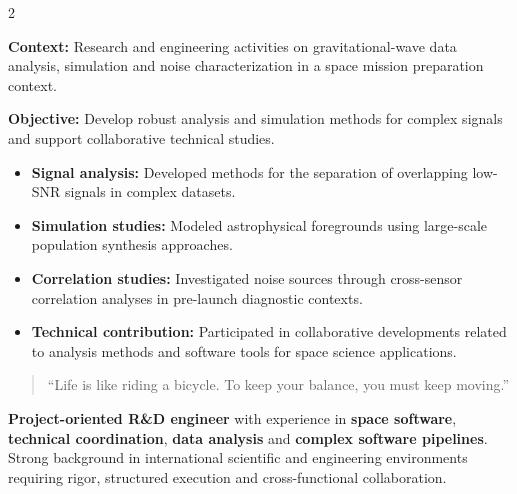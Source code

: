 \documentclass[8pt,a4paper,ragged2e,withhyper]{altacv}
\begin{document}
\begin{paracol}{2}
\divider


\textbf{Context:} Research and engineering activities on gravitational-wave data analysis, simulation and noise characterization in a space mission preparation context.

\textbf{Objective:} Develop robust analysis and simulation methods for complex signals and support collaborative technical studies.

\begin{itemize}
\item \textbf{Signal analysis:} Developed methods for the separation of overlapping low-SNR signals in complex datasets.
\item \textbf{Simulation studies:} Modeled astrophysical foregrounds using large-scale population synthesis approaches.
\item \textbf{Correlation studies:} Investigated noise sources through cross-sensor correlation analyses in pre-launch diagnostic contexts.
\item \textbf{Technical contribution:} Participated in collaborative developments related to analysis methods and software tools for space science applications.
\end{itemize}




\switchcolumn



\begin{quote}
``Life is like riding a bicycle. To keep your balance, you must keep moving.''
\end{quote}

\textbf{Project-oriented R\&D engineer} with experience in \textbf{space software}, \textbf{technical coordination}, \textbf{data analysis} and \textbf{complex software pipelines}. Strong background in international scientific and engineering environments requiring rigor, structured execution and cross-functional collaboration.


\end{paracol}
\end{document}
